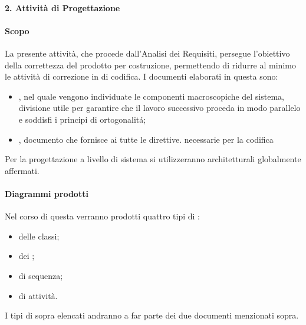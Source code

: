 			
		\paragraph*{2. Attività di Progettazione}
			\paragraph*{Scopo}
		        La presente attivit\`a, che procede dall'Analisi dei Requisiti, persegue l'obiettivo
		        della correttezza del prodotto per costruzione, permettendo di ridurre al minimo le attività di correzione
		        in  di codifica.
                        I documenti elaborati in questa  sono:
                        \begin{itemize}
                        \item {}, nel quale vengono individuate le componenti macroscopiche del sistema,
                          divisione utile per garantire che il lavoro successivo proceda in modo parallelo e soddisfi i principi di ortogonalit\'a;
                        \item {}, documento che fornisce ai  tutte le direttive. necessarie per la codifica
                        \end{itemize}
		        Per la progettazione a livello di sistema si utilizzeranno  architetturali globalmente affermati.
                 
                        \paragraph*{Diagrammi prodotti}
                        Nel corso di questa  verranno prodotti quattro tipi di  :
                        \begin{itemize}
                        \item {} delle classi;
                        \item {} dei ;
                        \item {} di sequenza;
                        \item {} di attivit\`a.
                        \end{itemize}
                        I tipi di  sopra elencati andranno a far parte dei due documenti menzionati sopra.
		
